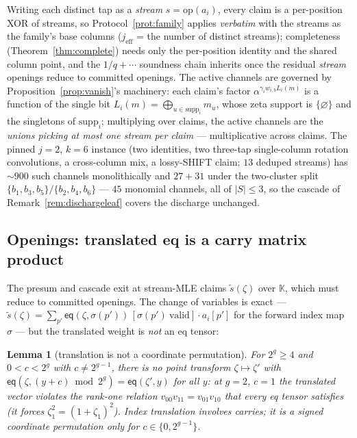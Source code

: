 \documentclass[11pt]{article}
\newcommand{\K}{\mathbb{K}}            %
\newcommand{\mle}[1]{\widetilde{#1}}
\newcommand{\eq}{\mathsf{eq}}
\theoremstyle{plain}
\newtheorem{lemma}[theorem]{Lemma}
\theoremstyle{definition}
\theoremstyle{remark}
\begin{document}
Writing each distinct tap as a \emph{stream}
$s = \mathrm{op}(a_{i})$, every claim is a per-position XOR of streams,
so Protocol~\ref{prot:family} applies \emph{verbatim} with the streams
as the family's base columns ($j_{\mathrm{eff}}$ = the number of
distinct streams); completeness (Theorem~\ref{thm:complete}) needs only
the per-position identity and the shared column point, and the
$1/q+\cdots$ soundness chain inherits once the residual \emph{stream}
openings reduce to committed openings. The active channels are governed
by Proposition~\ref{prop:vanish}'s machinery: each claim's factor
$\alpha^{\gamma_i w_{i,b} L_i(m)}$ is a function of the single bit
$L_i(m)=\bigoplus_{u\in\mathrm{supp}_i} m_u$, whose zeta support is
$\{\varnothing\}$ and the singletons of $\mathrm{supp}_i$; multiplying
over claims, the active channels are the \emph{unions picking at most
one stream per claim} --- multiplicative across claims. The pinned
$j{=}2$, $k{=}6$ instance (two identities, two three-tap single-column
rotation convolutions, a cross-column mix, a lossy-SHIFT claim; $13$
deduped streams) has ${\sim}900$ such channels monolithically and
$27+31$ under the two-cluster split $\{b_1,b_3,b_5\}/\{b_2,b_4,b_6\}$
--- $45$ monomial channels, all of $|S|\le3$, so the cascade of
Remark~\ref{rem:dischargeleaf} covers the discharge unchanged.

\subsection{Openings: translated eq is a carry matrix product}
\label{sec:tapopen}

The presum and cascade exit at stream-MLE claims $\mle{s}(\zeta)$ over
$\K$, which must reduce to committed openings. The change of variables
is exact --- $\mle{s}(\zeta)=\sum_{p'}\eq(\zeta,\sigma(p'))\,
[\sigma(p')\ \mathrm{valid}]\cdot a_i[p']$ for the forward index map
$\sigma$ --- but the translated weight is \emph{not} an eq tensor:

\begin{lemma}[translation is not a coordinate permutation]
\label{lem:notperm}
For $2^{g}\ge4$ and $0<c<2^{g}$ with $c\ne2^{g-1}$, there is no point
transform $\zeta\mapsto\zeta'$ with
$\eq(\zeta,(y+c)\bmod 2^{g})=\eq(\zeta',y)$ for all $y$: at $g=2$,
$c=1$ the translated vector violates the rank-one relation
$v_{00}v_{11}=v_{01}v_{10}$ that every eq tensor satisfies (it forces
$\zeta_1^2=(1+\zeta_1)^2$). Index translation involves carries; it is a
signed coordinate permutation only for $c\in\{0,2^{g-1}\}$.
\end{lemma}
\end{document}
